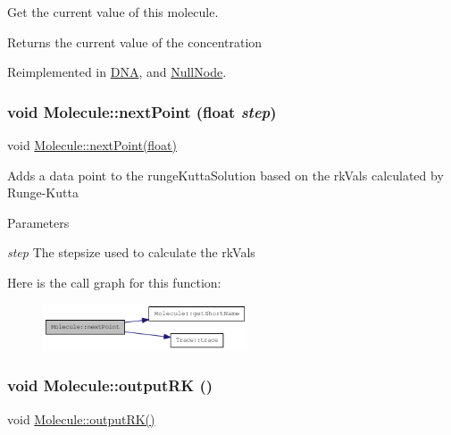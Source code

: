 Get the current value of this molecule.

\begin{DoxyReturn}{Returns}
the current value of the concentration 
\end{DoxyReturn}


Reimplemented in \hyperlink{classDNA_ac3f4ef00894483313ea44df6a85b3bab}{DNA}, and \hyperlink{classNullNode_ae1cddbf915028ab4f2aebf6879c6a682}{NullNode}.\hypertarget{classMolecule_af67c8a4dcbde3f500509ee1bd94ff4ef}{
\subsubsection[{nextPoint}]{\setlength{\rightskip}{0pt plus 5cm}void Molecule::nextPoint (float {\em step})}}
\label{classMolecule_af67c8a4dcbde3f500509ee1bd94ff4ef}
void \hyperlink{classMolecule_af67c8a4dcbde3f500509ee1bd94ff4ef}{Molecule::nextPoint(float)}

Adds a data point to the rungeKuttaSolution based on the rkVals calculated by Runge-\/Kutta


\begin{DoxyParams}{Parameters}
\item[{\em step}]The stepsize used to calculate the rkVals \end{DoxyParams}


Here is the call graph for this function:\nopagebreak
\begin{figure}[H]
\begin{center}
\leavevmode
\includegraphics[width=172pt]{classMolecule_af67c8a4dcbde3f500509ee1bd94ff4ef_cgraph}
\end{center}
\end{figure}
\hypertarget{classMolecule_ac6c78f4a49e270815d7e7dba311b7e14}{
\subsubsection[{outputRK}]{\setlength{\rightskip}{0pt plus 5cm}void Molecule::outputRK ()}}
\label{classMolecule_ac6c78f4a49e270815d7e7dba311b7e14}
void \hyperlink{classMolecule_ac6c78f4a49e270815d7e7dba311b7e14}{Molecule::outputRK()}

